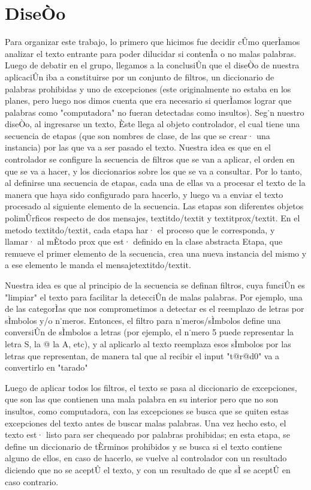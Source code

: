 \section{DiseÒo}

Para organizar este trabajo, lo primero que hicimos fue decidir cÛmo querÌamos analizar el texto entrante para poder dilucidar si contenÌa o no malas palabras. Luego de debatir en el grupo, llegamos a la conclusiÛn que el diseÒo de nuestra aplicaciÛn iba a constituirse por un conjunto de filtros, un diccionario de palabras prohibidas y uno de excepciones (este originalmente no estaba en los planes, pero luego nos dimos cuenta que era necesario si querÌamos lograr que palabras como "computadora" no fueran detectadas como insultos).
Seg˙n nuestro diseÒo, al ingresarse un texto, Èste llega al objeto controlador, el cual tiene una secuencia de etapas (que son nombres de clase, de las que se crear· una instancia) por las que va a ser pasado el texto. Nuestra idea es que en el controlador se configure la secuencia de filtros que se van a aplicar, el orden en que se va a hacer, y los diccionarios sobre los que se va a consultar. Por lo tanto, al definirse una secuencia de etapas, cada una de ellas va a procesar el texto de la manera que haya sido configurado para hacerlo, y luego va a enviar el texto procesado al siguiente elemento de la secuencia. Las etapas son diferentes objetos polimÛrficos respecto de dos mensajes, {textit}do{/textit} y {textit}prox{/textit}. En el metodo {textit}do{/textit}, cada etapa har· el proceso que le corresponda, y llamar· al mÈtodo prox que est· definido en la clase abstracta Etapa, que remueve el primer elemento de la secuencia, crea una nueva instancia del mismo y a ese elemento le manda el mensaje{textit}do{/textit}.

Nuestra idea es que al principio de la secuencia se definan filtros, cuya funciÛn es "limpiar" el texto para facilitar la detecciÛn de malas palabras. Por ejemplo, una de las categorÌas que nos comprometimos a detectar es el reemplazo de letras por sÌmbolos y/o n˙meros. Entonces, el filtro para n˙meros/sÌmbolos define una conversiÛn de sÌmbolos a letras (por ejemplo, el n˙mero 5 puede representar la letra S, la @ la A, etc), y al aplicarlo al texto reemplaza esos sÌmbolos por las letras que representan, de manera tal que al recibir el input "t@r@d0" va a convertirlo en "tarado"

Luego de aplicar todos los filtros, el texto se pasa al diccionario de excepciones, que son las que contienen una mala palabra en su interior pero que no son insultos, como computadora, con las excepciones se busca que se quiten estas excepciones del texto antes de buscar malas palabras. Una vez hecho esto, el texto est· listo para ser chequeado por palabras prohibidas; en esta etapa, se define un diccionario de tÈrminos prohibidos y se busca si el texto contiene alguno de ellos, en caso de hacerlo, se vuelve al controlador con un resultado diciendo que no se aceptÛ el texto, y con un resultado de que sÌ se aceptÛ en caso contrario. 

